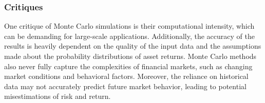 \subsubsection{Critiques}
One critique of Monte Carlo simulations is their computational intensity, which can be demanding for large-scale applications. Additionally, the accuracy of the results is heavily dependent on the quality of the input data and the assumptions made about the probability distributions of asset returns. Monte Carlo methods also never fully capture the complexities of financial markets, such as changing market conditions and behavioral factors. Moreover, the reliance on historical data may not accurately predict future market behavior, leading to potential misestimations of risk and return.

\newpage
